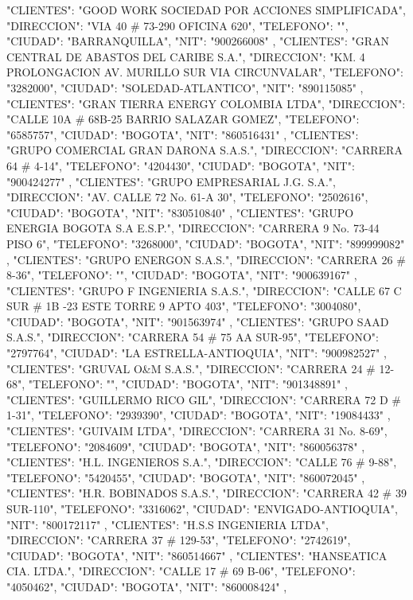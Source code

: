    {
   "CLIENTES": "GOOD WORK SOCIEDAD POR ACCIONES SIMPLIFICADA",
   "DIRECCION": "VIA 40 # 73-290 OFICINA 620",
   "TELEFONO": "",
   "CIUDAD": "BARRANQUILLA",
   "NIT": "900266008"
   },
   {
   "CLIENTES": "GRAN CENTRAL DE ABASTOS DEL CARIBE S.A.",
   "DIRECCION": "KM. 4 PROLONGACION AV. MURILLO SUR VIA CIRCUNVALAR",
   "TELEFONO": "3282000",
   "CIUDAD": "SOLEDAD-ATLANTICO",
   "NIT": "890115085"
   },
   {
   "CLIENTES": "GRAN TIERRA ENERGY COLOMBIA LTDA",
   "DIRECCION": "CALLE 10A # 68B-25 BARRIO SALAZAR GOMEZ",
   "TELEFONO": "6585757",
   "CIUDAD": "BOGOTA",
   "NIT": "860516431"
   },
   {
   "CLIENTES": "GRUPO COMERCIAL GRAN DARONA S.A.S.",
   "DIRECCION": "CARRERA 64 # 4-14",
   "TELEFONO": "4204430",
   "CIUDAD": "BOGOTA",
   "NIT": "900424277"
   },
   {
   "CLIENTES": "GRUPO EMPRESARIAL J.G. S.A.",
   "DIRECCION": "AV. CALLE 72 No. 61-A 30",
   "TELEFONO": "2502616",
   "CIUDAD": "BOGOTA",
   "NIT": "830510840"
   },
   {
   "CLIENTES": "GRUPO ENERGIA BOGOTA S.A E.S.P.",
   "DIRECCION": "CARRERA 9 No. 73-44 PISO 6",
   "TELEFONO": "3268000",
   "CIUDAD": "BOGOTA",
   "NIT": "899999082"
   },
   {
   "CLIENTES": "GRUPO ENERGON S.A.S.",
   "DIRECCION": "CARRERA 26 # 8-36",
   "TELEFONO": "",
   "CIUDAD": "BOGOTA",
   "NIT": "900639167"
   },
   {
   "CLIENTES": "GRUPO F INGENIERIA S.A.S.",
   "DIRECCION": "CALLE 67 C SUR # 1B -23 ESTE TORRE 9 APTO 403",
   "TELEFONO": "3004080",
   "CIUDAD": "BOGOTA",
   "NIT": "901563974"
   },
   {
   "CLIENTES": "GRUPO SAAD S.A.S.",
   "DIRECCION": "CARRERA 54 # 75 AA SUR-95",
   "TELEFONO": "2797764",
   "CIUDAD": "LA ESTRELLA-ANTIOQUIA",
   "NIT": "900982527"
   },
   {
   "CLIENTES": "GRUVAL O&M S.A.S.",
   "DIRECCION": "CARRERA 24 # 12-68",
   "TELEFONO": "",
   "CIUDAD": "BOGOTA",
   "NIT": "901348891"
   },
   {
   "CLIENTES": "GUILLERMO RICO GIL",
   "DIRECCION": "CARRERA 72 D # 1-31",
   "TELEFONO": "2939390",
   "CIUDAD": "BOGOTA",
   "NIT": "19084433"
   },
   {
   "CLIENTES": "GUIVAIM LTDA",
   "DIRECCION": "CARRERA 31 No. 8-69",
   "TELEFONO": "2084609",
   "CIUDAD": "BOGOTA",
   "NIT": "860056378"
   },
   {
   "CLIENTES": "H.L. INGENIEROS S.A.",
   "DIRECCION": "CALLE 76 # 9-88",
   "TELEFONO": "5420455",
   "CIUDAD": "BOGOTA",
   "NIT": "860072045"
   },
   {
   "CLIENTES": "H.R. BOBINADOS S.A.S.",
   "DIRECCION": "CARRERA 42 # 39 SUR-110",
   "TELEFONO": "3316062",
   "CIUDAD": "ENVIGADO-ANTIOQUIA",
   "NIT": "800172117"
   },
   {
   "CLIENTES": "H.S.S INGENIERIA LTDA",
   "DIRECCION": "CARRERA 37 # 129-53",
   "TELEFONO": "2742619",
   "CIUDAD": "BOGOTA",
   "NIT": "860514667"
   },
   {
   "CLIENTES": "HANSEATICA CIA. LTDA.",
   "DIRECCION": "CALLE 17 # 69 B-06",
   "TELEFONO": "4050462",
   "CIUDAD": "BOGOTA",
   "NIT": "860008424"
   },
